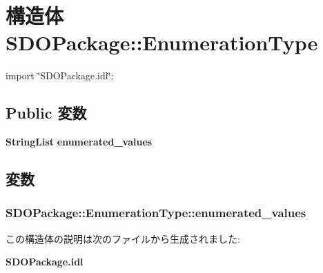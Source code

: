 \section{構造体 SDOPackage::EnumerationType}
\label{structSDOPackage_1_1EnumerationType}


{\ttfamily import \char`\"{}SDOPackage.idl\char`\"{};}

\subsection*{Public 変数}
\begin{DoxyCompactItemize}
\item 
{\bf StringList} {\bf enumerated\_\-values}
\end{DoxyCompactItemize}


\subsection{変数}
\subsubsection[{enumerated\_\-values}]{ {\bf SDOPackage::EnumerationType::enumerated\_\-values}}\label{structSDOPackage_1_1EnumerationType_a9b6c16891322e19809a402b850cb9243}


この構造体の説明は次のファイルから生成されました:\begin{DoxyCompactItemize}
\item 
{\bf SDOPackage.idl}\end{DoxyCompactItemize}
